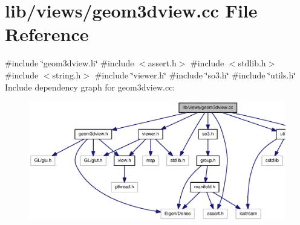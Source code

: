 \section{lib/views/geom3dview.cc \-File \-Reference}
\label{geom3dview_8cc}
{\ttfamily \#include \char`\"{}geom3dview.\-h\char`\"{}}\*
{\ttfamily \#include $<$assert.\-h$>$}\*
{\ttfamily \#include $<$stdlib.\-h$>$}\*
{\ttfamily \#include $<$string.\-h$>$}\*
{\ttfamily \#include \char`\"{}viewer.\-h\char`\"{}}\*
{\ttfamily \#include \char`\"{}so3.\-h\char`\"{}}\*
{\ttfamily \#include \char`\"{}utils.\-h\char`\"{}}\*
\-Include dependency graph for geom3dview.\-cc\-:\nopagebreak
\begin{figure}[H]
\begin{center}
\leavevmode
\includegraphics[width=350pt]{geom3dview_8cc__incl}
\end{center}
\end{figure}
